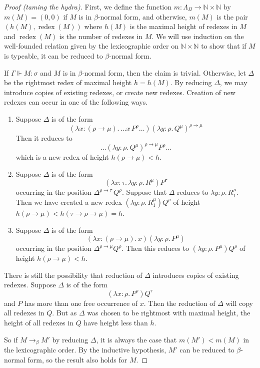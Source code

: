\begin{proof}[Proof (taming the hydra)]
    First, we define the function \( m : \Lambda_\Pi \to \mathbb N \times \mathbb N \) by \( m(M) = (0, 0) \) if \( M \) is in \( \beta \)-normal form, and otherwise, \( m(M) \) is the pair \( (h(M), \operatorname{redex}(M)) \) where \( h(M) \) is the maximal height of redexes in \( M \) and \( \operatorname{redex}(M) \) is the number of redexes in \( M \).
    We will use induction on the well-founded relation given by the lexicographic order on \( \mathbb N \times \mathbb N \) to show that if \( M \) is typeable, it can be reduced to \( \beta \)-normal form.

    If \( \Gamma \Vdash M : \sigma \) and \( M \) is in \( \beta \)-normal form, then the claim is trivial.
    Otherwise, let \( \Delta \) be the rightmost redex of maximal height \( h = h(M) \).
    By reducing \( \Delta \), we may introduce copies of existing redexes, or create new redexes.
    Creation of new redexes can occur in one of the following ways.
    \begin{enumerate}
        \item Suppose \( \Delta \) is of the form
        \[ (\lambda x:(\rho \to \mu).\, \dots x\, P^\rho \dots)(\lambda y:\rho.\, Q^\mu)^{\rho \to \mu} \]
        Then it reduces to
        \[ \dots (\lambda y:\rho.\, Q^\mu)^{\rho \to \mu} P^\rho \dots \]
        which is a new redex of height \( h(\rho \to \mu) < h \).
        \item Suppose \( \Delta \) is of the form
        \[ (\lambda x:\tau.\, \lambda y:\rho.\, R^\mu)P^\tau \]
        occurring in the position \( \Delta^{\rho \to \tau}\, Q^\rho \).
        Suppose that \( \Delta \) reduces to \( \lambda y:\rho.\, R^\mu_1 \).
        Then we have created a new redex \( (\lambda y:\rho.\, R^\mu_1) Q^\rho \) of height \( h(\rho \to \mu) < h(\tau \to \rho \to \mu) = h \).
        \item Suppose \( \Delta \) is of the form
        \[ (\lambda x:(\rho \to \mu).\, x)(\lambda y:\rho.\, P^\mu) \]
        occurring in the position \( \Delta^{\rho \to \mu} Q^\rho \).
        Then this reduces to \( (\lambda y:\rho.\, P^\mu) Q^\rho \) of height \( h(\rho \to \mu) < h \).
    \end{enumerate}
    There is still the possibility that reduction of \( \Delta \) introduces copies of existing redexes.
    Suppose \( \Delta \) is of the form
    \[ (\lambda x: \rho.\, P^\rho) Q^\tau \]
    and \( P \) has more than one free occurrence of \( x \).
    Then the reduction of \( \Delta \) will copy all redexes in \( Q \).
    But as \( \Delta \) was chosen to be rightmost with maximal height, the height of all redexes in \( Q \) have height less than \( h \).

    So if \( M \to_\beta M' \) by reducing \( \Delta \), it is always the case that \( m(M') < m(M) \) in the lexicographic order.
    By the inductive hypothesis, \( M' \) can be reduced to \( \beta \)-normal form, so the result also holds for \( M \).
\end{proof}

